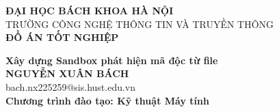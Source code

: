 \documentclass[DoAn.tex]{subfiles}
\begin{document}
\begin{titlepage}
\thispagestyle{empty}
\begin{center}

{\textbf{\large{ĐẠI HỌC BÁCH KHOA HÀ NỘI}}}\\
{\large{TRƯỜNG CÔNG NGHỆ THÔNG TIN VÀ TRUYỀN THÔNG}}\\[4cm]

{\textbf{\huge{ ĐỒ ÁN TỐT NGHIỆP}}}\\[1cm]
{\textbf{\Large{Xây dựng Sandbox phát hiện mã độc từ file}}\\[1cm]

{\textbf{\large{NGUYỄN XUÂN BÁCH}}}\\
{\large{bach.nx225259@sis.hust.edu.vn}}\\[0.5cm]

{\textbf{\large{Chương trình đào tạo: Kỹ thuật Máy tính
}}}\\


\vspace{3cm}
\begin{table}[H]
\centering
{}
\end{table}}
\end{center}



\end{titlepage}
\end{document}
